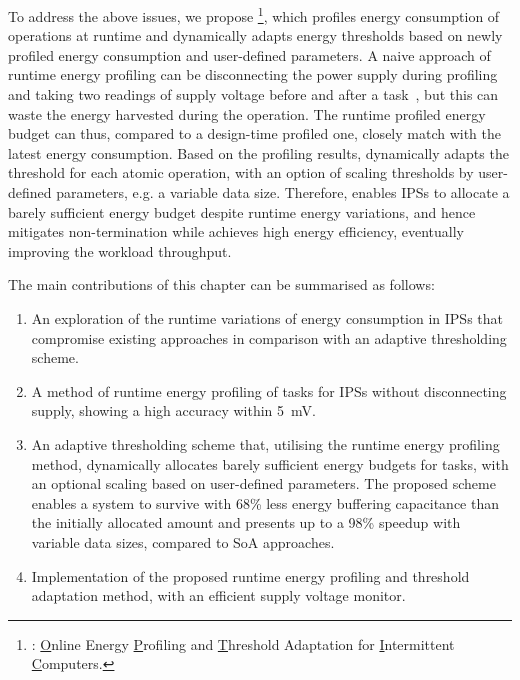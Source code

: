 
To address the above issues, we propose \nn{}\footnote{\nn{}: \underline{O}nline Energy \underline{P}rofiling and \underline{T}hreshold Adaptation for \underline{I}ntermittent \underline{C}omputers. }, which profiles energy consumption of operations at runtime and dynamically adapts energy thresholds based on newly profiled energy consumption and user-defined parameters. 
A naive approach of runtime energy profiling can be disconnecting the power supply during profiling and taking two readings of supply voltage before and after a task~\cite{zhan2020adaptive}, but this can waste the energy harvested during the operation. 
The runtime profiled energy budget can thus, compared to a design-time profiled one, closely match with the latest energy consumption. 
Based on the profiling results, \nn{} dynamically adapts the threshold for each atomic operation, with an option of scaling thresholds by user-defined parameters, e.g. a variable data size.
Therefore, \nn{} enables IPSs to allocate a barely sufficient energy budget despite runtime energy variations, and hence mitigates non-termination while achieves high energy efficiency, eventually improving the workload throughput.

The main contributions of this chapter can be summarised as follows:

\begin{enumerate}
    \item An exploration of the runtime variations of energy consumption in IPSs that compromise existing approaches in comparison with an adaptive thresholding scheme. 
    \item A method of runtime energy profiling of tasks for IPSs without disconnecting supply, showing a high accuracy within \SI{5}{\milli\volt}.
    \item An adaptive thresholding scheme that, utilising the runtime energy profiling method, dynamically allocates barely sufficient energy budgets for tasks, with an optional scaling based on user-defined parameters. 
    The proposed scheme enables a system to survive with 68\% less energy buffering capacitance than the initially allocated amount and presents up to a 98\% speedup with variable data sizes, compared to SoA approaches.
    \item Implementation of the proposed runtime energy profiling and threshold adaptation method, with an efficient supply voltage monitor.
\end{enumerate}

